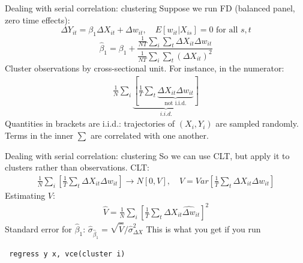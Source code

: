 \documentclass[notes=show,beamer,compress]{beamer}
\begin{document}
\begin{frame}{Dealing with serial correlation: clustering}
Suppose we run FD (balanced panel, zero time effects):
\begin{equation*}
\Delta{}Y_{it} = \beta_1\Delta{}X_{it} + \Delta{}w_{it}, \quad E[w_{it}|X_{is}]=0 \text{ for all $s,t$}
\end{equation*}
\begin{equation*}
\widehat\beta_1 = \beta_1 + \frac{\frac{1}{NT}\sum_i\sum_t\Delta{}X_{it}\Delta w_{it}}{\frac{1}{NT}\sum_i\sum_t(\Delta{}X_{it})^2}
\end{equation*}
Cluster observations by cross-sectional unit. For instance, in the numerator:
\begin{align*}
\frac{1}{N}\sum_i\underbrace{\left[\frac{1}{T}\sum_t\underbrace{\Delta{}X_{it}\Delta{}w_{it}}_{\text{not i.i.d.}}\right]}_{i.i.d.}
\end{align*}
Quantities in brackets are i.i.d.: trajectories of $(X_i, Y_i)$ are sampled randomly. Terms in the inner $\sum$ are correlated with one another.

\end{frame}


\begin{frame}{Dealing with serial correlation: clustering}
So we can use CLT, but apply it to clusters rather than observations. CLT:
\begin{align*}
\frac{1}{N}\sum_i\left[\frac{1}{T}\sum_t\Delta{}X_{it}\Delta w_{it}\right]\to{}N[0, V], \quad V = Var\left[\frac{1}{T}\sum_t\Delta{}X_{it}\Delta w_{it}\right]
\end{align*}
Estimating $V$:
\begin{align*}
	\widehat{V} = \frac{1}{N}\sum_i\left[\frac{1}{T}\sum_t\Delta{}X_{it}\widehat{\Delta w}_{it}\right]^2
\end{align*}
Standard error for $\widehat\beta_1$: $\widehat{\sigma}_{\widehat{\beta}_1} = \sqrt{\widehat{V}}/\widehat{\sigma}_{\Delta{}X}^2$
This is what you get if you run
\begin{center}\texttt{
	regress y x, vce(cluster i)}
\end{center}

\end{frame}
\end{document}
